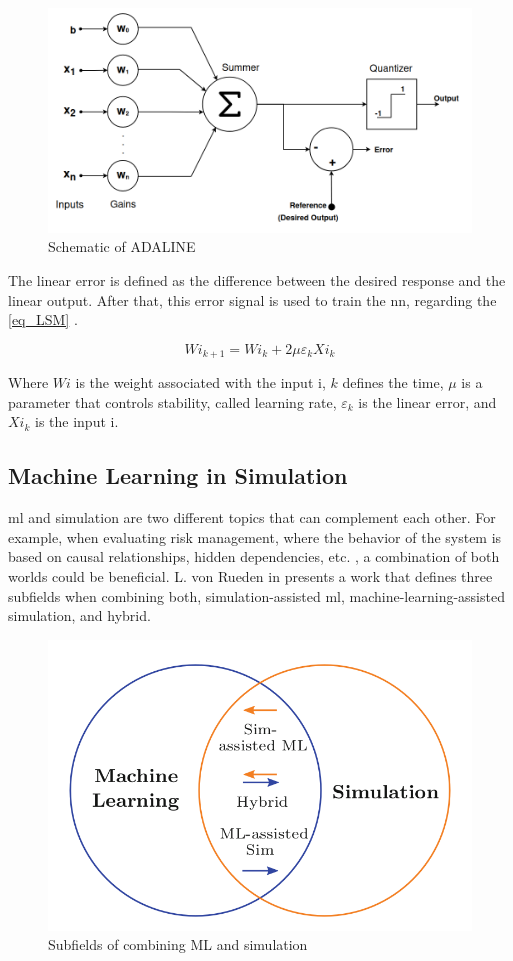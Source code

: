 \begin{figure}[H]
	\centering
 	\includegraphics[width=0.8\linewidth]{Images/AdalineSquematic.png}
 	\caption{Schematic of ADALINE \cite{widrow1960adaptive}}
	 \label{fig_AdalineSquematic}
\end{figure}

The linear error is defined as the difference between the desired response and the linear output. After that, this error signal is used 
to train the \gls{nn}, regarding the \autoref{eq_LSM} \cite{widrow1995perceptrons}.

\begin{equation}
    Wi_{k+1} = Wi_{k} + 2 \mu \varepsilon_{k}Xi_{k}
    \label{eq_LSM}
\end{equation}

Where $Wi$ is the weight associated with the input i, $k$ defines the time, $\mu$ is a parameter that controls stability, called learning 
rate, $\varepsilon_{k}$ is the linear error, and $Xi_{k}$ is the input i. 

\subsection{Machine Learning in Simulation}

\gls{ml} and simulation are two different topics that can complement each other. For example, when evaluating risk management, where the 
behavior of the system is based on causal relationships, hidden dependencies, etc. \cite{mitchell2017natural}, a combination of both worlds 
could be beneficial.  L. von Rueden in \cite{von2020combining} presents a work that defines three subfields when combining both, 
simulation-assisted \gls{ml}, machine-learning-assisted simulation, and hybrid.

\begin{figure}[H]
	\centering
 	\includegraphics[width=0.5\linewidth]{Images/SimAndML.png}
 	\caption{Subfields of combining ML and simulation \cite{von2020combining}}
\end{figure}

